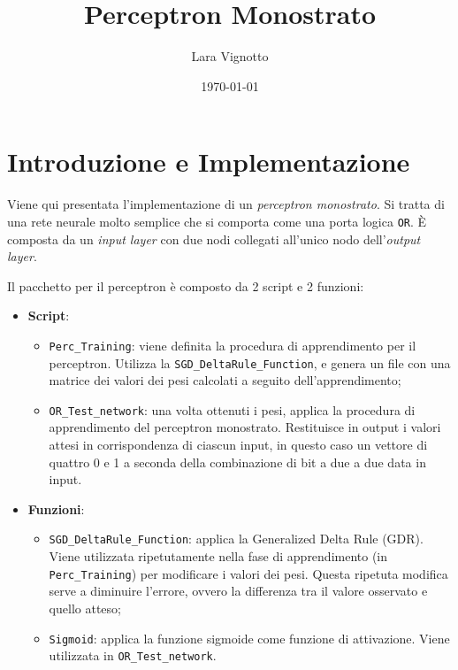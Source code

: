 \documentclass[a4paper,11pt]{article}
\title{\textbf{Perceptron Monostrato}}
\author{Lara Vignotto}
\date{\today}
\begin{document}
\maketitle
\vspace{.5cm}


\section{Introduzione e Implementazione}

Viene qui presentata l'implementazione di un \emph{perceptron monostrato}. Si tratta di una rete neurale molto semplice che si comporta come una porta logica \texttt{OR}. È composta da un \emph{input layer} con due nodi collegati all'unico nodo dell'\emph{output layer}.

Il pacchetto per il perceptron è composto da 2 script e 2 funzioni:

\begin{itemize}
    \item \textbf{Script}:
    \begin{itemize}
        \item \texttt{Perc\_Training}: viene definita la procedura di apprendimento per il perceptron. Utilizza la \texttt{SGD\_DeltaRule\_Function}, e genera un file con una matrice dei valori dei pesi calcolati a seguito dell'apprendimento;
        \item \texttt{OR\_Test\_network}: una volta ottenuti i pesi, applica la procedura di apprendimento del perceptron monostrato. Restituisce in output i valori attesi in corrispondenza di ciascun input, in questo caso un vettore di quattro 0 e 1 a seconda della combinazione di bit a due a due data in input.
    \end{itemize}

    \item \textbf{Funzioni}:
    \begin{itemize}
        \item \texttt{SGD\_DeltaRule\_Function}: applica la Generalized Delta Rule (GDR). Viene utilizzata ripetutamente nella fase di apprendimento (in \texttt{Perc\_Training}) per modificare i valori dei pesi. Questa ripetuta modifica serve a diminuire l'errore, ovvero la differenza tra il valore osservato e quello atteso;
        \item \texttt{Sigmoid}: applica la funzione sigmoide come funzione di attivazione. Viene utilizzata in \texttt{OR\_Test\_network}.
    \end{itemize}
\end{itemize}
\end{document}
